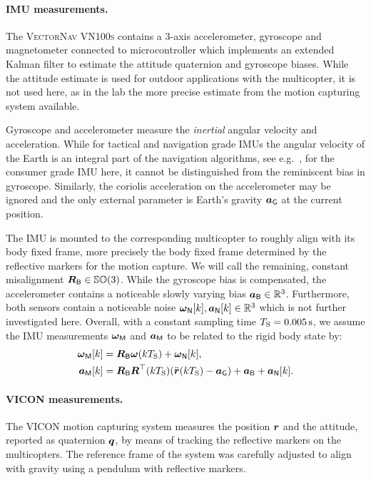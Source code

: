 \paragraph{IMU measurements.}
The \textsc{VectorNav VN100s} contains a 3-axis accelerometer, gyroscope and magnetometer connected to microcontroller which implements an extended Kalman filter to estimate the attitude quaternion and gyroscope biases.
While the attitude estimate is used for outdoor applications with the multicopter, it is not used here, as in the lab the more precise estimate from the motion capturing system available.

Gyroscope and accelerometer measure the \textit{inertial} angular velocity and acceleration.
While for tactical and navigation grade IMUs the angular velocity of the Earth is an integral part of the navigation algorithms, see e.g.\ \cite{Savage:Strapdown1}, for the consumer grade IMU here, it cannot be distinguished from the reminiscent bias in gyroscope.
Similarly, the coriolis acceleration on the accelerometer may be ignored and the only external parameter is Earth's gravity $\boldsymbol{a}_{\mathsf{G}}$ at the current position.

The IMU is mounted to the corresponding multicopter to roughly align with its body fixed frame, more precisely the body fixed frame determined by the reflective markers for the motion capture.
We will call the remaining, constant misalignment $\boldsymbol{R}_{\mathsf{B}} \in \mathbb{SO}(3)$.
While the gyroscope bias is compensated, the accelerometer contains a noticeable slowly varying bias $\boldsymbol{a}_{\mathsf{B}} \in \mathbb{R}^3$.
Furthermore, both sensors contain a noticeable noise $\boldsymbol{\omega}_{\mathsf{N}}[k], \boldsymbol{a}_{\mathsf{N}}[k] \in \mathbb{R}^3$ which is not further investigated here.
Overall, with a constant sampling time $T_{\mathrm{S}}=0.005\,\text{s}$, we assume the IMU measurements $\boldsymbol{\omega}_{\mathsf{M}}$ and $\boldsymbol{a}_{\mathsf{M}}$ to be related to the rigid body state by:
\begin{align}\label{eq:RealizationImuModel}
 \boldsymbol{\omega}_{\mathsf{M}}[k] &= \boldsymbol{R}_{\mathsf{B}} \boldsymbol{\omega}(kT_{\mathrm{S}}) + \boldsymbol{\omega}_{\mathsf{N}}[k],
\\
 \boldsymbol{a}_{\mathsf{M}}[k] &=  \boldsymbol{R}_{\mathsf{B}} \boldsymbol{R}^\top(kT_{\mathrm{S}}) (\ddot{\boldsymbol{r}}(kT_{\mathrm{S}}) - \boldsymbol{a}_{\mathsf{G}}) + \boldsymbol{a}_{\mathsf{B}} + \boldsymbol{a}_{\mathsf{N}}[k]
 .
\end{align}

\paragraph{VICON measurements.}
The \textsc{VICON} motion capturing system measures the position $\boldsymbol{r}$ and the attitude, reported as quaternion $\boldsymbol{q}$, by means of tracking the reflective markers on the multicopters.
The reference frame of the system was carefully adjusted to align with gravity using a pendulum with reflective markers.

